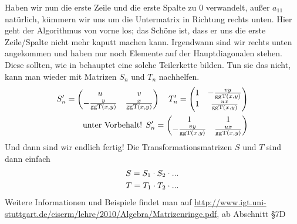 \begin{*anmerkung}[Teil 3]	
	Haben wir nun die erste Zeile und die erste Spalte zu 0 verwandelt, außer $a_{11}$ natürlich, kümmern wir uns um die Untermatrix in Richtung rechts unten. Hier geht der Algorithmus von vorne los; das Schöne ist, dass er uns die erste Zeile/Spalte nicht mehr kaputt machen kann. Irgendwann sind wir rechts unten angekommen und haben nur noch Elemente auf der Hauptdiagonalen stehen. Diese sollten, wie in  behauptet eine solche Teilerkette bilden. Tun sie das nicht, kann man wieder mit Matrizen $S_n$ und $T_n$ nachhelfen.
	\begin{align}
		S'_n=\begin{pmatrix}u & v \\ -\frac{y}{\operatorname{ggT}(x,y)} & \frac{x}{\operatorname{ggT}(x,y)}\end{pmatrix}\quad 
		T'_n=\begin{pmatrix}1 & -\frac{vy}{\operatorname{ggT}(x,y)} \\ 1 & \frac{ux}{\operatorname{ggT}(x,y)}\end{pmatrix} \notag \\
		\text{unter Vorbehalt! }S'_n=\begin{pmatrix}1 & 1 \\ -\frac{vy}{\operatorname{ggT}(x,y)} & \frac{ux}{\operatorname{ggT}(x,y)}\end{pmatrix}\notag
	\end{align}
	Und dann sind wir endlich fertig! Die Transformationsmatrizen $S$ und $T$ sind dann einfach
	\begin{align}
		S = S_1\cdot S_2\cdot ... \notag \\
		T = T_1\cdot T_2\cdot ... \notag
	\end{align}
	Weitere Informationen und Beispiele findet man auf \url{http://www.igt.uni-stuttgart.de/eiserm/lehre/2010/Algebra/Matrizenringe.pdf}, ab Abschnitt §7D
\end{*anmerkung}

